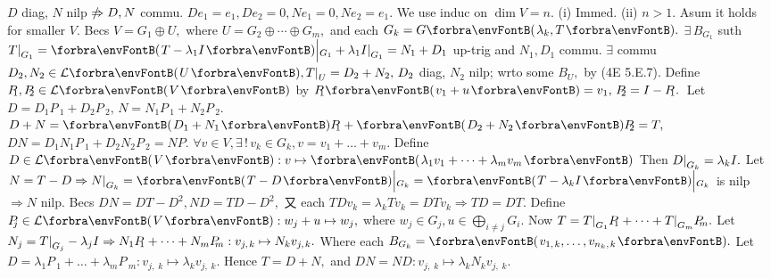 \ANote $D$ diag, $N$ nilp $\notRightarrow D,N$ commu. \AExa $De_1=e_1,De_2=0,Ne_1=0,Ne_2=e_1.$ %
\vspace{2pt}\parSol{}
We use induc on $\dim V=n.$ (i) Immed. (ii) $n>1.$ Asum it holds for smaller $V.$\parSol{}
Becs $V=G_1\oplus U,$ where $U=G_2\oplus\cdots\oplus G_m,$ and each $G_k=G\Par{\lambda_k,T}.$\parSol{}
$\exists\,B_{G_1}$ suth $T\mmid_{G_1}=\Par{T-\lambda_1I}\Big|{_{G_1}}+\lambda_1I\mmid_{G_1}=N_1+D_1$ up-trig and $N_1,D_1$ commu.\parSol{}
$\exists$ commu $D_2,N_2\in\Lm{U},T\mmid_U=D_2+N_2,\,D_2$ diag, $N_2$ nilp; wrto some $B_U,$ by (4E 5.E.7).\parSol{}
Define $P_{\!\!\!\:1},P_{\!\!\!\:2}\in\Lm{V}$ by $P_{\!\!\!\:1}\Par{v_1+u}=v_1,\,P_{\!\!\!\:2}=I-P_{\!\!\!\:1}.$ \,Let $D=D_1P_{\!\!\!\:1}+D_2P_{\!\!\!\:2},\,N=N_1P_{\!\!\!\:1}+N_2P_{\!\!\!\:2}.$\parSol{}
$D+N=\Par{D_1+N_1}P_{\!\!\!\:1}+\Par{D_2+N_2}P_{\!\!\!\:2}=T,$ \, $DN=D_1N_1P_{\!\!\!\:1}+D_2N_2P_{\!\!\!\:2}=NP.$\PfEnd\vspace{4pt}\parSol{}
\Or $\forall v\in V,\exists\,!\,v_k\in G_k,v=v_1+\dots+v_m.$ Define $D\in\Lm{V}:v\mapsto\Par{\lambda_1v_1+\dots+\lambda_mv_m}$\parSol{}
Then $D\text{\normalsize|}_{G_k}=\lambda_kI.$ Let $N=T-D\Rightarrow N\mmid_{G_k}=\Par{T-D}\Big|{_{G_k}}=\Par{T-\lambda_kI}\Big|{_{G_k}}$ is nilp $\Rightarrow N$ nilp.\parSol{}
Becs $DN=DT-D^2,ND=TD-D^2,$ 又 each $TDv_k=\lambda_kTv_k=DTv_k\Rightarrow TD=DT.$\PfEnd\vspace{4pt}\parSol{}
\Or Define $P_{\!\!\!\:j}\in\Lm{V}:w_j+u\mapsto w_j,$ where $w_j\in G_j,u\in\bigoplus_{i\neq j}G_i.$\parSol{}
Now $T=T\text{\normalsize|}_{G_1}P_{\!\!\!\:1}+\dots+T\text{\normalsize|}_{G_m}P_{\!\!\!\:m}.$ \:Let $N_j=T\mmid_{G_j}-\lambda_jI\Rightarrow N_1P_{\!\!\!\:1}+\dots+N_mP_{\!\!\!\:m}:v_{j,\;\!k}\mapsto N_kv_{j,\;\!k}.$\parSol{}
Where each $B_{G_k}=\Par{v_{1,\;\!k},\dots,v_{n_k,\;\!k}}.$ \:Let $D=\lambda_1P_{\!\!\!\:1}+\dots+\lambda_mP_{\!\!\!\:m}:v_{j,\;\!k}\mapsto\lambda_kv_{j,\;\!k}.$\parSol{}
Hence $T=D+N,$ and $DN=ND:v_{j,\;\!k}\mapsto\lambda_kN_kv_{j,\;\!k}.$\PfEnd
\SepLine\pagebreak

